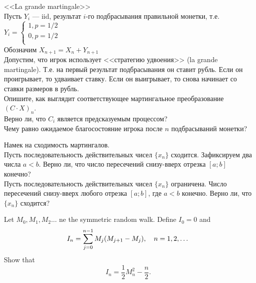 \begin{problem}
 <<La grande martingale>> \\
Пусть $Y_{i}$ --- iid, результат $i$-го подбрасывания правильной
монетки, т.е. $ Y_{i}= 
\begin{cases}
1, p=1/2 \\
0, p=1/2 \\
\end{cases}$ \\
Обозначим $X_{n+1}=X_{n}+Y_{n+1}$ \\
Допустим, что игрок использует <<стратегию удвоения>> (la grande
martingale). Т.е. на первый результат подбрасывания он ставит
рубль. Если он проигрывает, то удваивает ставку. Если он
выигрывает, то снова начинает со ставки размеров в рубль. \\
Опишите, как выглядит соответствующее мартингальное преобразование
$(C\cdot X)_{n}$. \\
Верно ли, что $C_{i}$ является предсказуемым процессом? \\
Чему равно ожидаемое благосостояние игрока после $n$ подбрасываний
монетки? 
\end{problem} 
\begin{solution} 

\end{solution}

\begin{problem}
 Намек на сходимость мартингалов. \\
Пусть последовательность действительных чисел $\{x_{n}\}$
сходится. Зафиксируем два числа $a<b$. Верно ли, что число
пересечений снизу-вверх отрезка $[a;b]$ конечно? \\
Пусть последовательность действительных чисел $\{x_{n}\}$
ограничена. Число пересечений снизу-вверх любого отрезка $[a;b]$,
где $a<b$ конечно. Верно ли, что $\{x_{n}\}$ сходится? 
\end{problem} 
\begin{solution} 

\end{solution}

\begin{problem}
 Let $M_0,M_1,M_2\dots$ ne the symmetric random walk. Define $I_0=0$ and
\[
I_n=\sum\limits_{j=0}^{n-1} M_j(M_{j+1}-M_j),\quad n=1,2,\dots
\]
\ni Show that
\[
I_n=\frac{1}{2}M_n^2-\frac{n}{2}.
\]
\end{problem} 
\begin{solution} 

\end{solution}

